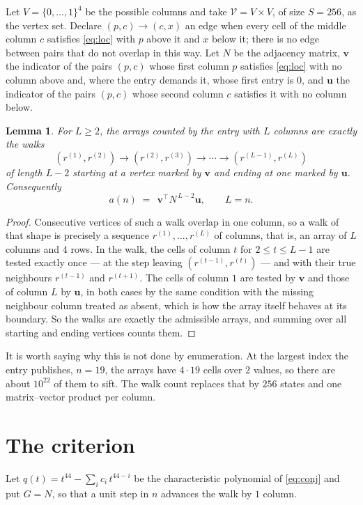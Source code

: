 \documentclass[11pt,a4paper]{article}
\theoremstyle{plain}
\newtheorem{lemma}[theorem]{Lemma}
\theoremstyle{definition}
\begin{document}
Let $V=\{0,\dots,1\}^{4}$ be the possible columns and take
$\mathcal V=V\times V$, of size $S=256$, as the vertex set. Declare $(p,c)\to(c,x)$ an edge
when every cell of the middle column $c$ satisfies \eqref{eq:loc} with $p$ above it and $x$
below it; there is no edge between pairs that do not overlap in this way. Let $N$ be the
adjacency matrix, $\mathbf{v}$ the indicator of the pairs $(p,c)$ whose first column $p$
satisfies \eqref{eq:loc} with no column above and, where the entry demands it, whose first entry is $0$, and $\mathbf{u}$ the indicator of
the pairs $(p,c)$ whose second column $c$ satisfies it with no column below.

\begin{lemma}\label{lem:walk}
For $L\ge2$, the arrays counted by the entry with $L$ columns are exactly the walks
\[
(r^{(1)},r^{(2)})\to(r^{(2)},r^{(3)})\to\cdots\to(r^{(L-1)},r^{(L)})
\]
of length $L-2$ starting at a vertex marked by $\mathbf{v}$ and ending at one marked by
$\mathbf{u}$. Consequently
\[
a(n)\;=\;\,\mathbf{v}^{\!\top}N^{\,L-2}\mathbf{u},\qquad L=n .
\]
\end{lemma}

\begin{proof}
Consecutive vertices of such a walk overlap in one column, so a walk of that shape is
precisely a sequence $r^{(1)},\dots,r^{(L)}$ of columns, that is, an array of $L$ columns
and $4$ rows. In the walk, the cells of column $t$ for $2\le t\le L-1$ are tested
exactly once --- at the step leaving $(r^{(t-1)},r^{(t)})$ --- and with their true
neighbours $r^{(t-1)}$ and $r^{(t+1)}$. The cells of column $1$ are tested by
$\mathbf{v}$ and those of column $L$ by $\mathbf{u}$, in both cases by the same condition
with the missing neighbour column treated as absent, which is how the array itself behaves at
its boundary. So the walks are exactly the admissible arrays, and summing over all starting
and ending vertices counts them.
\end{proof}


It is worth saying why this is not done by enumeration. At the largest index the entry
publishes, $n=19$, the arrays have $4\cdot19$ cells over
$2$ values, so there are about $10^{22}$ of them to sift. The
walk count replaces that by $256$ states and one matrix--vector product per column.
\section{The criterion}

Let $q(t)=t^{44}-\sum_i c_i\,t^{44-i}$ be the characteristic polynomial of
\eqref{eq:conj} and put $G=N$, so that a unit step in $n$ advances the walk by
$1$ column.
\end{document}
